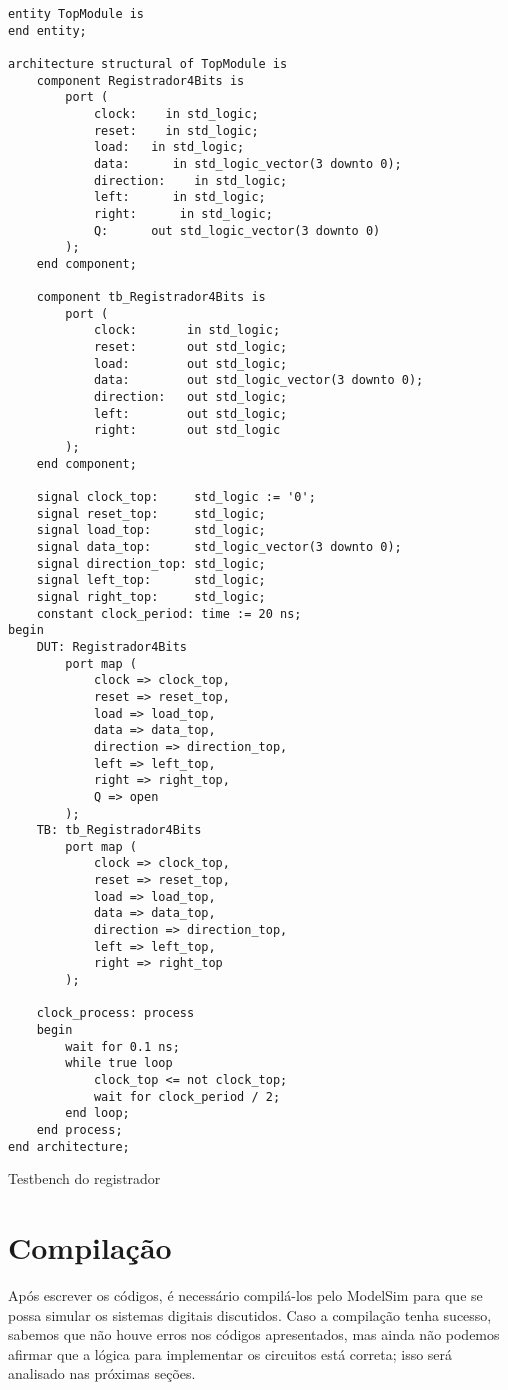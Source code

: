 \documentclass[a4paper,12pt]{article}
\newenvironment{code}{\captionsetup{type=listing}}{}
\begin{document}
\begin{code}
    \begin{verbatim}
entity TopModule is
end entity;

architecture structural of TopModule is
    component Registrador4Bits is
        port (
            clock:    in std_logic;
            reset:    in std_logic;
            load:   in std_logic;
            data:      in std_logic_vector(3 downto 0);
            direction:    in std_logic;
            left:      in std_logic;
            right:      in std_logic;
            Q:      out std_logic_vector(3 downto 0)
        );
    end component;

    component tb_Registrador4Bits is
        port (
            clock:       in std_logic;
            reset:       out std_logic;
            load:        out std_logic;
            data:        out std_logic_vector(3 downto 0);
            direction:   out std_logic;
            left:        out std_logic;
            right:       out std_logic
        );
    end component;

    signal clock_top:     std_logic := '0';
    signal reset_top:     std_logic;
    signal load_top:      std_logic;
    signal data_top:      std_logic_vector(3 downto 0);
    signal direction_top: std_logic;
    signal left_top:      std_logic;
    signal right_top:     std_logic;
    constant clock_period: time := 20 ns;
begin
    DUT: Registrador4Bits
        port map (
            clock => clock_top,
            reset => reset_top,
            load => load_top,
            data => data_top,
            direction => direction_top,
            left => left_top,
            right => right_top,
            Q => open
        );
    TB: tb_Registrador4Bits
        port map (
            clock => clock_top,
            reset => reset_top,
            load => load_top,
            data => data_top,
            direction => direction_top,
            left => left_top,
            right => right_top
        );

    clock_process: process
    begin
        wait for 0.1 ns;
        while true loop
            clock_top <= not clock_top;
            wait for clock_period / 2;
        end loop;
    end process;
end architecture;
    \end{verbatim}
    \caption{Testbench do registrador}
\end{code}

\section{Compilação}
Após escrever os códigos, é necessário compilá-los pelo ModelSim para que se possa simular os sistemas digitais discutidos. Caso a compilação tenha sucesso, sabemos que não houve erros nos códigos apresentados, mas ainda não podemos afirmar que a lógica para implementar os circuitos está correta; isso será analisado nas próximas seções.
\end{document}
